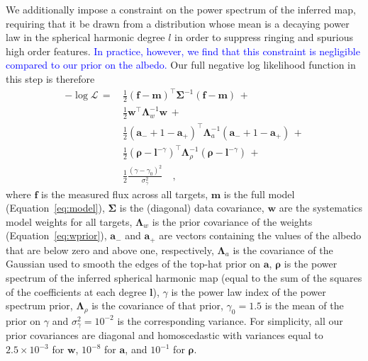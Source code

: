 \documentclass[modern]{aastex62}
\newcommand{\edited}[1]{\textcolor{blue}{#1}}
\begin{document}
We additionally impose a constraint on the power spectrum of the
inferred map, requiring that it be drawn from a distribution whose mean
is a decaying power law in the spherical harmonic degree $l$ in order
to suppress ringing and spurious high order features.
\edited{%
In practice, however, we find that this constraint is negligible compared
to our prior on the albedo.
}%
Our full negative log likelihood function in this step is therefore
%
\begin{align}
    \label{eq:nll}
    -\log\mathcal{L} \, = \, 
        &\frac{1}{2}(\mathbf{f} - \mathbf{m})^\top \boldsymbol{\Sigma}^{-1} (\mathbf{f} - \mathbf{m}) \, + \nonumber \\
        &\frac{1}{2}\mathbf{w}^\top \boldsymbol{\Lambda}_w^{-1} \mathbf{w} \, + \nonumber \\
        &\frac{1}{2}(\mathbf{a_-} + 1 - \mathbf{a_+})^\top \boldsymbol{\Lambda}_a^{-1} (\mathbf{a_-} + 1 - \mathbf{a_+}) \, + \nonumber \\
        &\frac{1}{2}(\boldsymbol{\rho} - \boldsymbol{l}^{-\gamma})^\top \boldsymbol{\Lambda}_\rho^{-1} (\boldsymbol{\rho} - \boldsymbol{l}^{-\gamma}) \, + \nonumber \\
        &\frac{1}{2} \frac{(\gamma - \gamma_0)^2}{\sigma_\gamma^2}
        \quad,
\end{align}
%
where $\mathbf{f}$ is the measured flux across all targets,
$\mathbf{m}$ is the full model (Equation~\ref{eq:model}),
$\boldsymbol{\Sigma}$ is the (diagonal) data covariance, 
$\mathbf{w}$ are the systematics model weights for all targets,
$\boldsymbol{\Lambda}_w$ is the prior covariance of the weights
(Equation~\ref{eq:wprior}), $\mathbf{a_-}$ and $\mathbf{a_+}$ are
vectors containing the values of the albedo that are below zero and above one, 
respectively, $\boldsymbol{\Lambda}_a$ is the covariance of the Gaussian
used to smooth the edges of the top-hat prior on $\mathbf{a}$,
$\boldsymbol{\rho}$ is the power spectrum of the inferred spherical harmonic map
(equal to the sum of the squares of the coefficients at each degree $\boldsymbol{l}$),
$\gamma$ is the power law index of the power spectrum prior, $\boldsymbol{\Lambda}_\rho$ is the
covariance of that prior, $\gamma_0 = 1.5$ is the mean of the prior on $\gamma$
and $\sigma_\gamma^2 = 10^{-2}$ is the corresponding variance.
%
For simplicity, all our prior covariances are diagonal and
homoscedastic with variances equal to $2.5\times 10^{-3}$ for $\mathbf{w}$,
$10^{-8}$ for $\mathbf{a}$, and $10^{-1}$ for $\boldsymbol{\rho}$.
\end{document}
